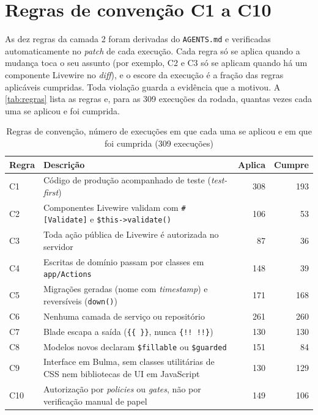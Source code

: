 
\section{Regras de convenção C1 a C10}
\label{apd:regras}

As dez regras da camada 2 foram derivadas do \texttt{AGENTS.md} e verificadas
automaticamente no \textit{patch} de cada execução. Cada regra só se aplica
quando a mudança toca o seu assunto (por exemplo, C2 e C3 só se aplicam quando
há um componente Livewire no \textit{diff}), e o escore da execução é a fração
das regras aplicáveis cumpridas. Toda violação guarda a evidência que a
motivou. A \autoref{tab:regras} lista as regras e, para as 309 execuções da
rodada, quantas vezes cada uma se aplicou e foi cumprida.

\begin{table}[htb]
    \centering
    \ABNTEXfontereduzida
    \caption{Regras de convenção, número de execuções em que cada uma se aplicou e em que foi cumprida (309 execuções)}
    \label{tab:regras}
    \begin{tabular}{lp{9.2cm}rr}
        \toprule
        \textbf{Regra} & \textbf{Descrição} & \textbf{Aplica} & \textbf{Cumpre} \\
        \midrule
        C1 & Código de produção acompanhado de teste (\textit{test-first}) & 308 & 193 \\
        C2 & Componentes Livewire validam com \texttt{\#[Validate]} e \texttt{\$this->validate()} & 106 & 53 \\
        C3 & Toda ação pública de Livewire é autorizada no servidor & 87 & 36 \\
        C4 & Escritas de domínio passam por classes em \texttt{app/Actions} & 148 & 39 \\
        C5 & Migrações geradas (nome com \textit{timestamp}) e reversíveis (\texttt{down()}) & 171 & 168 \\
        C6 & Nenhuma camada de serviço ou repositório & 261 & 260 \\
        C7 & Blade escapa a saída (\texttt{\{\{ \}\}}, nunca \texttt{\{!! !!\}}) & 130 & 130 \\
        C8 & Modelos novos declaram \texttt{\$fillable} ou \texttt{\$guarded} & 151 & 84 \\
        C9 & Interface em Bulma, sem classes utilitárias de CSS nem bibliotecas de UI em JavaScript & 130 & 129 \\
        C10 & Autorização por \textit{policies} ou \textit{gates}, não por verificação manual de papel & 149 & 106 \\
        \bottomrule
    \end{tabular}
    \fonteautor
\end{table}
